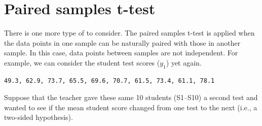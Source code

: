 \documentclass[
  openany]{krantz}
\begin{document}
\hypertarget{paired-samples-t-test}{%
\section{Paired samples t-test}\label{paired-samples-t-test}}

There is one more type of  to consider.
The paired samples t-test is applied when the data points in one sample can be naturally paired with those in another sample.
In this case, data points between samples are not independent.
For example, we can consider the student test scores (\(y_{1}\)) yet again.

\begin{verbatim}
49.3, 62.9, 73.7, 65.5, 69.6, 70.7, 61.5, 73.4, 61.1, 78.1
\end{verbatim}

Suppose that the teacher gave these same 10 students (S1--S10) a second test and wanted to see if the mean student score changed from one test to the next (i.e., a two-sided hypothesis).
\end{document}
